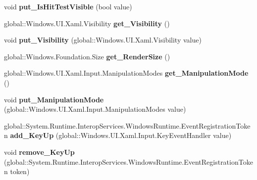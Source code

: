 \begin{DoxyCompactItemize}
void {\bfseries put\+\_\+\+Is\+Hit\+Test\+Visible} (bool value)
\item 
\mbox{\label{interface_windows_1_1_u_i_1_1_xaml_1_1_i_u_i_element_a1d08cd5eebdac6a853903eb22a27b689}} 
global\+::\+Windows.\+U\+I.\+Xaml.\+Visibility {\bfseries get\+\_\+\+Visibility} ()
\item 
\mbox{\label{interface_windows_1_1_u_i_1_1_xaml_1_1_i_u_i_element_aad5d9c40429e519a8d16db9da184a42b}} 
void {\bfseries put\+\_\+\+Visibility} (global\+::\+Windows.\+U\+I.\+Xaml.\+Visibility value)
\item 
\mbox{\label{interface_windows_1_1_u_i_1_1_xaml_1_1_i_u_i_element_a436b4b809e5f92e434326f446a1b3fb0}} 
global\+::\+Windows.\+Foundation.\+Size {\bfseries get\+\_\+\+Render\+Size} ()
\item 
\mbox{\label{interface_windows_1_1_u_i_1_1_xaml_1_1_i_u_i_element_ac7efa9d3bcb66e3a95621d9e942b339d}} 
global\+::\+Windows.\+U\+I.\+Xaml.\+Input.\+Manipulation\+Modes {\bfseries get\+\_\+\+Manipulation\+Mode} ()
\item 
\mbox{\label{interface_windows_1_1_u_i_1_1_xaml_1_1_i_u_i_element_ae026809f65653a37cd75df9589dc5e90}} 
void {\bfseries put\+\_\+\+Manipulation\+Mode} (global\+::\+Windows.\+U\+I.\+Xaml.\+Input.\+Manipulation\+Modes value)
\item 
\mbox{\label{interface_windows_1_1_u_i_1_1_xaml_1_1_i_u_i_element_abae2e6510442e3bf03b0abd24270a3e7}} 
global\+::\+System.\+Runtime.\+Interop\+Services.\+Windows\+Runtime.\+Event\+Registration\+Token {\bfseries add\+\_\+\+Key\+Up} (global\+::\+Windows.\+U\+I.\+Xaml.\+Input.\+Key\+Event\+Handler value)
\item 
\mbox{\label{interface_windows_1_1_u_i_1_1_xaml_1_1_i_u_i_element_a5d62f2ed59084c31013a2397faab0314}} 
void {\bfseries remove\+\_\+\+Key\+Up} (global\+::\+System.\+Runtime.\+Interop\+Services.\+Windows\+Runtime.\+Event\+Registration\+Token token)

\end{DoxyCompactItemize}
